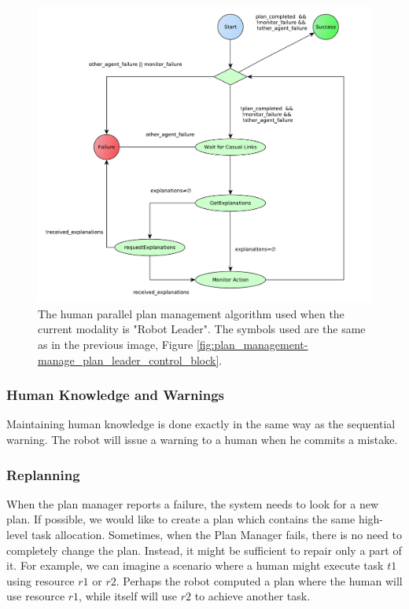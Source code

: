\begin{figure}[ht!]
 \centering
 \includegraphics[scale=0.5]{img/plan_management/manage_plan_leader_humans.pdf}
 \caption{The human parallel plan management algorithm used when the current modality is "Robot Leader". The symbols used are the same as in the previous image, Figure \ref{fig:plan_management-manage_plan_leader_control_block}.}
 \label{fig:plan_management-manage_plan_leader_humans}
 \end{figure}


\subsubsection{Human Knowledge and Warnings}
Maintaining human knowledge is done exactly in the same way as the sequential warning. The robot will issue a warning to a human when he commits a mistake.

\subsubsection{Replanning}
When the plan manager reports a failure, the system needs to look for a new plan. If possible, we would like to create a plan which contains the same high-level task allocation. Sometimes, when the Plan Manager fails, there is no need to completely change the plan. Instead, it might be sufficient to repair only a part of it. For example, we can imagine a scenario where a human might execute task $t1$ using resource $r1$ or $r2$. Perhaps the robot computed a plan where the human will use resource $r1$, while itself will use $r2$ to achieve another task.

